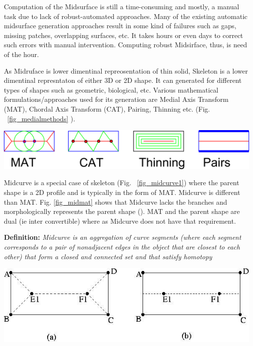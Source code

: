 \documentclass[9pt,academicons]{article}
\begin{document}
Computation of the Midsurface is still a time-consuming and mostly, a manual task due to lack of robust-automated approaches. Many of the existing automatic midsurface generation approaches result in some kind of failures such as gaps, missing patches, overlapping surfaces, etc. It takes hours or even days to correct such errors with manual intervention. Computing robust Midsirface, thus, is need of the hour.


	
	
As Midruface is lower dimentinal repreosentation of thin solid, Skeleton is a lower dimentinal represntaton of either 3D or 2D shape. It can generated for different types of shapes such as geometric, biological, etc. Various mathematical formulations/approaches used for its generation are Medial Axis Transform (MAT), Chordal Axis Transform (CAT), Pairing, Thinning etc. (Fig. ~\ref{fig_medialmethods} ). 

    \begin{center}
	\includegraphics[width=0.6\linewidth]{images/MedialMethodsOnlyShort}
	\label{fig_medialmethods}
    \end{center}
		
Midcurve is a special case of skeleton (Fig. ~\ref{fig_midcurve1}) where the parent shape is a 2D profile and is typically in the form of MAT. Midcurve is different than MAT. Fig. \ref{fig_midmat} shows that Midcurve lacks the branches and morphologically represents the parent shape (\cite{Ramanathan04}). MAT and the parent shape are dual (ie inter convertible) where as Midcurve does not have that requirement.

{\bf Definition:} \textit{Midcurve is an aggregation of curve segments (where each segment corresponds to a pair of nonadjacent edges in the object that are closest to each other) that form a closed and connected set and that satisfy homotopy}


    \begin{center}
	\includegraphics[width=0.6\linewidth]{images/Medial-Axis-and-Mid-curve_W640}
	\label{fig_midmat}
    \end{center}
		
\end{document}

